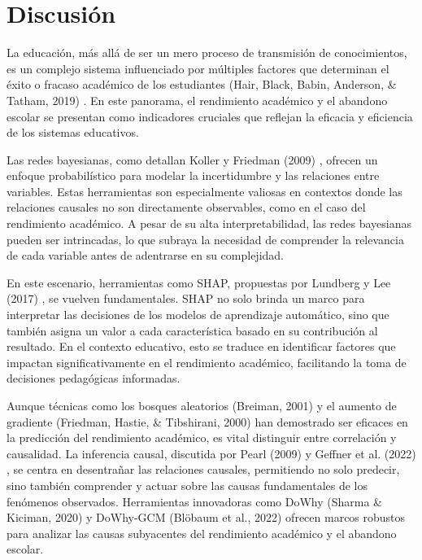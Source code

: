 \hypertarget{discusiuxf3n}{%
\section{Discusión}\label{discusiuxf3n}}

La educación, más allá de ser un mero proceso de transmisión de conocimientos, es un complejo sistema influenciado por múltiples factores que determinan el éxito o fracaso académico de los estudiantes (Hair, Black, Babin, Anderson, \& Tatham, 2019) \cite{hair2019advanced}. En este panorama, el rendimiento académico y el abandono escolar se presentan como indicadores cruciales que reflejan la eficacia y eficiencia de los sistemas educativos.

Las redes bayesianas, como detallan Koller y Friedman (2009) \cite{koller2009introduction}, ofrecen un enfoque probabilístico para modelar la incertidumbre y las relaciones entre variables. Estas herramientas son especialmente valiosas en contextos donde las relaciones causales no son directamente observables, como en el caso del rendimiento académico. A pesar de su alta interpretabilidad, las redes bayesianas pueden ser intrincadas, lo que subraya la necesidad de comprender la relevancia de cada variable antes de adentrarse en su complejidad.

En este escenario, herramientas como SHAP, propuestas por Lundberg y Lee (2017) \cite{lundberg2017unified}, se vuelven fundamentales. SHAP no solo brinda un marco para interpretar las decisiones de los modelos de aprendizaje automático, sino que también asigna un valor a cada característica basado en su contribución al resultado. En el contexto educativo, esto se traduce en identificar factores que impactan significativamente en el rendimiento académico, facilitando la toma de decisiones pedagógicas informadas.

Aunque técnicas como los bosques aleatorios (Breiman, 2001) \cite{breiman2001random} y el aumento de gradiente (Friedman, Hastie, \& Tibshirani, 2000) \cite{friedman2000additive} han demostrado ser eficaces en la predicción del rendimiento académico, es vital distinguir entre correlación y causalidad. La inferencia causal, discutida por Pearl (2009) \cite{pearl2009introduction} y Geffner et al. (2022) \cite{geffner2022deep}, se centra en desentrañar las relaciones causales, permitiendo no solo predecir, sino también comprender y actuar sobre las causas fundamentales de los fenómenos observados. Herramientas innovadoras como DoWhy (Sharma \& Kiciman, 2020) \cite{sharma2020dowhy} y DoWhy-GCM (Blöbaum et al., 2022) \cite{blobaum2022dowhy} ofrecen marcos robustos para analizar las causas subyacentes del rendimiento académico y el abandono escolar.

